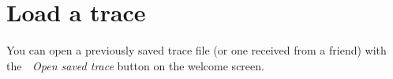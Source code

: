 \chapter{Load a trace }
\hypertarget{md__mono_engine_2thirdparty_2tracy_2profiler_2src_2achievements_2_load_trace}{}\label{md__mono_engine_2thirdparty_2tracy_2profiler_2src_2achievements_2_load_trace}
\label{md__mono_engine_2thirdparty_2tracy_2profiler_2src_2achievements_2_load_trace_autotoc_md1112}%
%


You can open a previously saved trace file (or one received from a friend) with the {\itshape  Open saved trace} button on the welcome screen. 